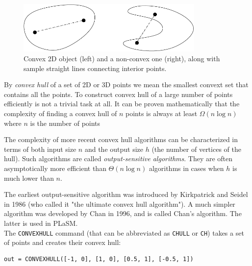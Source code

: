 \begin{figure}[!ht]
\begin{center}
\includegraphics[width=0.82\textwidth]{img/convex.pdf}
\end{center}
\vspace{-4mm}
\caption{Convex 2D object (left) and a non-convex one (right), along with 
         sample straight lines connecting interior points.}
\label{fig:convex}
\end{figure}
\noindent
By {\em convex hull} of a set of 2D or 3D points we mean the smallest convext 
set that contains all the points. To construct convex hull of a large number 
of points efficiently is not a trivial task at all. It can be proven 
mathematically that the complexity of finding a convex hull of $n$ points 
is always at least $Ω(n \log n)$ where $n$ is the number of points 
 
The complexity of more recent convex hull algorithms can be characterized 
in terms of both input size $n$ and the output size $h$ (the number of vertices
of the hull). Such algorithms are called {\em output-sensitive algorithms}. 
They are often asymptotically more efficient than $Θ(n \log n)$ algorithms 
in cases when $h$ is much lower than $n$. 

The earliest output-sensitive 
algorithm was introduced by Kirkpatrick and Seidel in 1986 (who 
called it "the ultimate convex hull algorithm"). A much simpler algorithm 
was developed by Chan in 1996, and is called Chan's algorithm. The latter
is used in PLaSM. \\

\noindent
The {\tt CONVEXHULL} command (that can be abbreviated as {\tt CHULL} or {\tt CH})
takes a set of points and creates their convex hull:\\

\begin{bbox}
\begin{verbatim}
out = CONVEXHULL([-1, 0], [1, 0], [0.5, 1], [-0.5, 1])
\end{verbatim}
\end{bbox}
\vspace{6mm}

